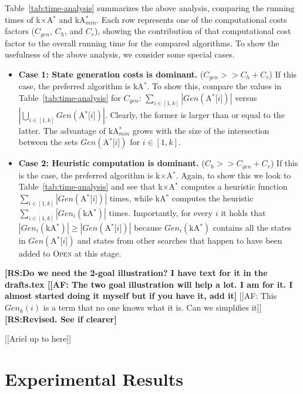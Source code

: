 \documentclass{aicom2e}
\newcommand{\kgs}{$k$GP}
\newcommand{\astar}{A$^*$}
\newcommand{\kastar}{kA$^*$}
\newcommand{\kastarmin}{kA$^*_{min}$}
\newcommand{\kastarmax}{kA$^*_{max}$}
\newcommand{\kxastar}{k$\times$A$^*$}
\newcommand{\astari}[1]{A$^*$[$#1$]}
\newcommand{\minf}{$F_{min}(n)$}
\newcommand{\open}{\textsc{Open}}
\newcommand{\roni}[1]{\textbf{[RS:#1]}}
\begin{document}
Table~\ref{tab:time-analysis} summarizes the above analysis, comparing the
running times of \kxastar{} and \kastarmin{}. Each row represents one of the
computational costs factors ($C_{gen}$, $C_{h}$, and $C_{r}$), 
showing the contribution of that computational cost factor to the overall
running time for the compared algorithms. To show the usefulness of the above
analysis, we consider some special cases.
\begin{itemize}
    \item {\bf Case 1: State generation costs is dominant.} ($C_{gen}>>C_{h}+C_r$)
    If this case, the preferred algorithm is \kastar{}. To show this,
    compare the values in Table~\ref{tab:time-analysis} for $C_{gen}$: $\sum_{i\in[1,k]} |Gen(\text{\astari{i}})|$
    versus $|\bigcup_{i\in[1,k]} Gen(\text{\astari{i}})|$. Clearly, the former is larger than or equal to the latter.
    The advantage of \kastarmin{} grows with the size of the intersection between the sets $Gen(\text{\astari{i}})$ for $i\in[1,k]$.

    \item {\bf Case 2: Heuristic computation is dominant.} ($C_{h}>>C_{gen}+C_r$)
    If this is the case, the preferred algorithm is \kxastar{}. Again, to show this we look to Table~\ref{tab:time-analysis} and see that \kxastar{} computes a heuristic function
    $\sum_{i\in[1,k]} |Gen(\text{\astari{i}})|$ times, while
    \kastar{} computes the heuristic $\sum_{i\in[1,k]} |Gen_i(\text{\kastar})|$ times.
    Importantly, for every $i$ it holds that $|Gen_i(\text{\kastar})|\geq |Gen(\text{\astari{i}})|$
    because $Gen_i(\text{\kastar})$ contains all the states in $Gen(\text{\astari{i}})$
    and states from other searches that happen to have been added to \open{} at this stage.
\end{itemize}

\roni{Do we need the 2-goal illustration? I have text for it in the drafts.tex
[[AF: The two goal illustration will help a lot. I am for it. I almost started
doing it myself but if you have it, add it}
[[AF: This  $Gen_k(i)$ is a term that no one knows what it is. Can we
simplifies it]]
\roni{Revised. See if clearer}

[[Ariel up to here]]

\section{Experimental Results}

\end{document}
